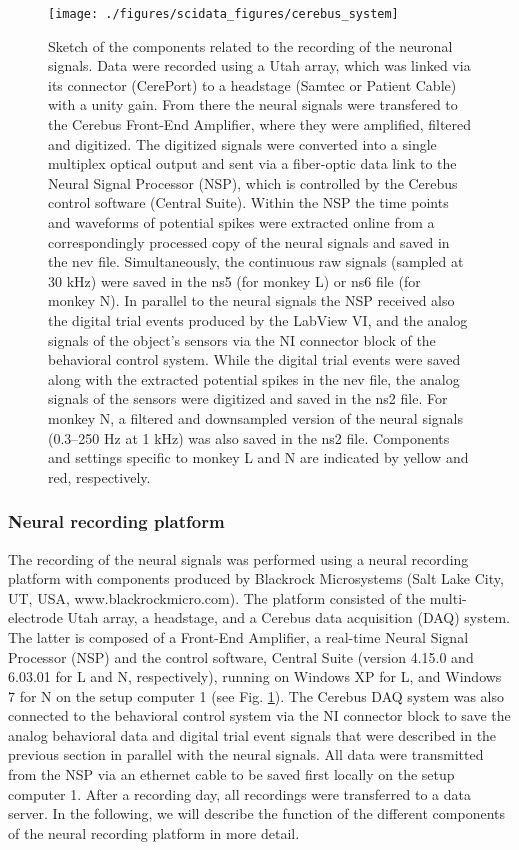 {\begin{figure}
 \texttt{[image: ./figures/scidata\_figures/cerebus\_system]}
 \caption[Sketch of the components related to the recording of the neuronal signals]{Sketch of the components related to the recording of the neuronal signals. Data were recorded
using a Utah array, which was linked via its connector (CerePort) to a headstage (Samtec or Patient Cable) with
a unity gain. From there the neural signals were transfered to the Cerebus Front-End Amplifier, where they
were amplified, filtered and digitized. The digitized signals were converted into a single multiplex optical output
and sent via a fiber-optic data link to the Neural Signal Processor (NSP), which is controlled by the Cerebus
control software (Central Suite). Within the NSP the time points and waveforms of potential spikes were
extracted online from a correspondingly processed copy of the neural signals and saved in the nev file.
Simultaneously, the continuous raw signals (sampled at 30 kHz) were saved in the ns5 (for monkey L) or ns6
file (for monkey N). In parallel to the neural signals the NSP received also the digital trial events produced by
the LabView VI, and the analog signals of the object’s sensors via the NI connector block of the behavioral
control system. While the digital trial events were saved along with the extracted potential spikes in the nev file,
the analog signals of the sensors were digitized and saved in the ns2 file. For monkey N, a filtered and
downsampled version of the neural signals (0.3–250 Hz at 1 kHz) was also saved in the ns2 file. Components
and settings specific to monkey L and N are indicated by yellow and red, respectively.}
\label{fig:cerebus_system}
\end{figure}


\subsubsection{Neural recording platform}
The recording of the neural signals was performed using a neural recording platform with components produced by Blackrock Microsystems (Salt Lake City, UT, USA, www.blackrockmicro.com). The platform consisted of the multi-electrode Utah array, a headstage, and a Cerebus data acquisition (DAQ) system. The latter is composed of a Front-End Amplifier, a real-time Neural Signal Processor (NSP) and the control software, Central Suite (version 4.15.0 and 6.03.01 for L and N, respectively), running on Windows XP for L, and Windows 7 for N on the setup computer 1 (see Fig. \cref{fig:cerebus_system}). The Cerebus DAQ system was also connected to the behavioral control system via the NI connector block to save the analog behavioral data and digital trial event signals that were described in the previous section in parallel with the neural signals. All data were transmitted from the NSP via an ethernet cable to be saved first locally on the setup computer 1. After a recording day, all recordings were transferred to a data server. In the following, we will describe the function of the different components of the neural recording platform in more detail.

}
